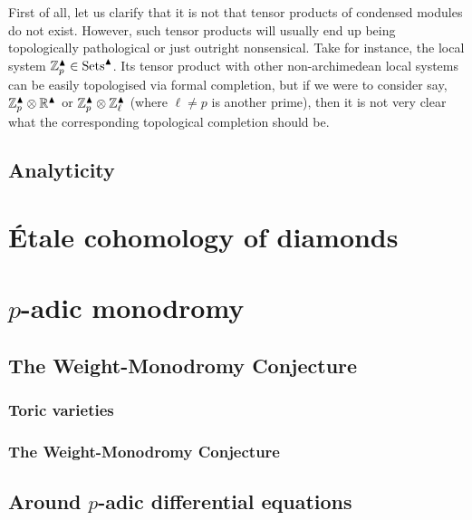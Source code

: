             First of all, let us clarify that it is not that tensor products of condensed modules do not exist. However, such tensor products will usually end up being topologically pathological or just outright nonsensical. Take for instance, the local system $\mathbb{Z}_p^{\blacktriangle} \in \mathrm{Sets}^{\blacktriangle}$. Its tensor product with other non-archimedean local systems can be easily topologised via formal completion, but if we were to consider say, $\Z_p^{\cond} \tensor \R^{\cond}$ or $\Z_p^{\cond} \tensor \Z_{\ell}^{\cond}$ (where $\ell \not = p$ is another prime), then it is not very clear what the corresponding topological completion should be.  
            
        \subsection{Analyticity}
    
    \section{\'Etale cohomology of diamonds}
        
    \section{\texorpdfstring{$p$}{}-adic monodromy}
        \subsection{The Weight-Monodromy Conjecture}
            \subsubsection{Toric varieties}
            
            \subsubsection{The Weight-Monodromy Conjecture}
            
        \subsection{Around \texorpdfstring{$p$}{}-adic differential equations}